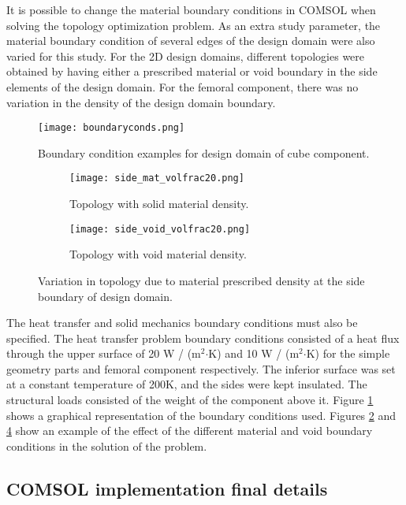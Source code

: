 \documentclass[../main.tex]{subfiles}
\begin{document}
It is possible to change the material boundary conditions in COMSOL when solving the topology optimization problem. As an extra study parameter, the material boundary condition of several edges of the design domain were also varied for this study. For the 2D design domains, different topologies were obtained by having either a prescribed material or void boundary in the side elements of the design domain. For the femoral component, there was no variation in the density of the design domain boundary. 
\begin{figure}[h!]
  \centering
  \texttt{[image: boundaryconds.png]}
  \caption{Boundary condition examples for design domain of cube component.} 
  \label{fig:boundary}
\end{figure}


\begin{figure}
  \begin{subfigure}{0.45\textwidth}
    \texttt{[image: side\_mat\_volfrac20.png]}
    \caption{Topology with solid material density.}
    \label{fig:solid}
  \end{subfigure}
  \begin{subfigure}{0.45\textwidth}
    \texttt{[image: side\_void\_volfrac20.png]}
    \caption{Topology with void material density.}
    \label{fig:void}
  \end{subfigure}
  \caption{Variation in topology due to material prescribed density at the side boundary of design domain.}
\end{figure}

The heat transfer and solid mechanics boundary conditions must also be specified. The heat transfer problem boundary conditions consisted of a heat flux through the upper surface of 20 W / (m$^2$$\cdot$K) and 10 W / (m$^2$$\cdot$K) for the simple geometry parts and femoral component respectively. The inferior surface was set at a constant temperature of 200\degree K, and the sides were kept insulated. The structural loads consisted of the weight of the component above it. Figure  \ref{fig:boundary} shows a graphical representation of the boundary conditions used. Figures \ref{fig:solid} and \ref{fig:void} show an example of the effect of the different material and void boundary conditions in the solution of the problem.

\subsection{COMSOL implementation final details}
\end{document}

